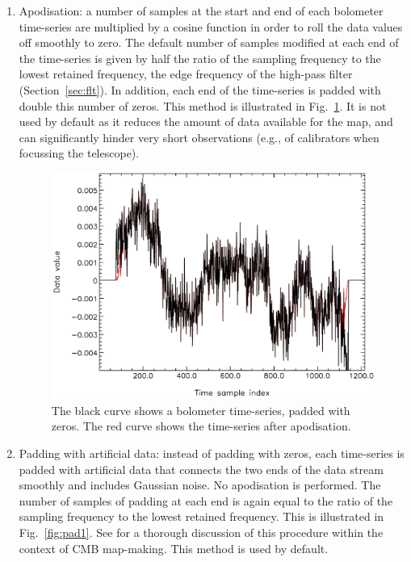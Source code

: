 \documentclass[useAMS,usenatbib,nofootinbib]{mn2e}
\begin{document}
\begin{enumerate}

\item Apodisation: a number of samples at the start and end of each
bolometer time-series are multiplied by a cosine function in order to
roll the data values off smoothly to zero. The default number of
samples modified at each end of the time-series is given by half the
ratio of the sampling frequency to the lowest retained frequency, the
edge frequency of the high-pass filter (Section~\ref{sec:flt}). In
addition, each end of the time-series is padded with double this
number of zeros. This method is illustrated in Fig.~\ref{fig:pad2}. It
is not used by default as it reduces the amount of data available for
the map, and can significantly hinder very short observations (e.g.,
of calibrators when focussing the telescope).

\begin{figure}
\centering
\includegraphics[width=\linewidth]{pad2}
\caption{The black curve shows a bolometer time-series, padded
with zeros. The red curve shows the time-series after apodisation.}
\label{fig:pad2}
\end{figure}

\item Padding with artificial data: instead of padding with zeros,
each time-series is padded with artificial data that connects the two
ends of the data stream smoothly and includes Gaussian noise. No
apodisation is performed. The number of samples of padding at each end
is again equal to the ratio of the sampling frequency to the lowest
retained frequency.  This is illustrated in Fig.~\ref{fig:pad1}. See
\citet{stompor2002} for a thorough discussion of this procedure within
the context of CMB map-making. This method is used by default.


\end{enumerate}
\end{document}
